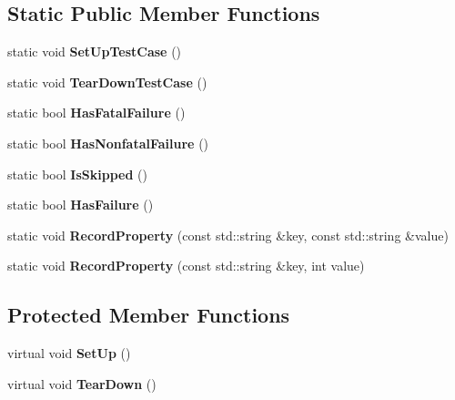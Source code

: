 \subsection*{Static Public Member Functions}
\begin{DoxyCompactItemize}
\item 
\mbox{\label{classtesting_1_1_test_a5ccbac42fee8c5b00b0bfe89b6c49d79}} 
static void {\bfseries Set\+Up\+Test\+Case} ()
\item 
\mbox{\label{classtesting_1_1_test_af374706cbaf0ffc460f4fd04e7c150f1}} 
static void {\bfseries Tear\+Down\+Test\+Case} ()
\item 
\mbox{\label{classtesting_1_1_test_a5e83604628ef542af888d631566ff60c}} 
static bool {\bfseries Has\+Fatal\+Failure} ()
\item 
\mbox{\label{classtesting_1_1_test_a8c00e8cc6fe10616b480bd54d2a426cb}} 
static bool {\bfseries Has\+Nonfatal\+Failure} ()
\item 
\mbox{\label{classtesting_1_1_test_a7f0ada5dbc9e772acb2b6cd0b1b300d7}} 
static bool {\bfseries Is\+Skipped} ()
\item 
\mbox{\label{classtesting_1_1_test_a7a00be7dd0a6bfdc8d47a1b784623613}} 
static bool {\bfseries Has\+Failure} ()
\item 
\mbox{\label{classtesting_1_1_test_a1559ce1c83f56993b582650c091535a7}} 
static void {\bfseries Record\+Property} (const std\+::string \&key, const std\+::string \&value)
\item 
\mbox{\label{classtesting_1_1_test_a373da47b491b1e64e355d22d6ec99b5b}} 
static void {\bfseries Record\+Property} (const std\+::string \&key, int value)
\end{DoxyCompactItemize}
\subsection*{Protected Member Functions}
\begin{DoxyCompactItemize}
\item 
\mbox{\label{classtesting_1_1_test_a190315150c303ddf801313fd1a777733}} 
virtual void {\bfseries Set\+Up} ()
\item 
\mbox{\label{classtesting_1_1_test_a5f0ab439802cbe0ef7552f1a9f791923}} 
virtual void {\bfseries Tear\+Down} ()
\end{DoxyCompactItemize}

